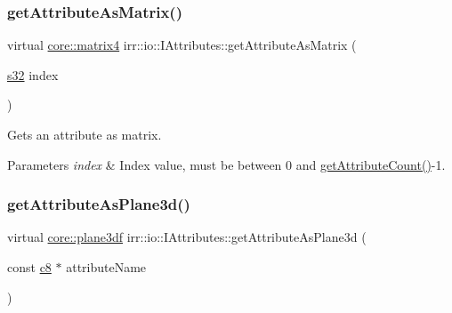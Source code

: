 \subsubsection{\texorpdfstring{get\+Attribute\+As\+Matrix()}{getAttributeAsMatrix()}\hspace{0.1cm}{\footnotesize\ttfamily [2/2]}}
{\footnotesize\ttfamily virtual \hyperlink{namespaceirr_1_1core_a73fa92e638c5ca97efd72da307cc9b65}{core\+::matrix4} irr\+::io\+::\+I\+Attributes\+::get\+Attribute\+As\+Matrix (\begin{DoxyParamCaption}\item[{\hyperlink{namespaceirr_ac66849b7a6ed16e30ebede579f9b47c6}{s32}}]{index }\end{DoxyParamCaption})\hspace{0.3cm}{\ttfamily [pure virtual]}}



Gets an attribute as matrix. 


\begin{DoxyParams}{Parameters}
{\em index} & Index value, must be between 0 and \hyperlink{classirr_1_1io_1_1IAttributes_a796bdd9440ee7ba0b6742a90a82870b6}{get\+Attribute\+Count()}-\/1. \\
\hline
\end{DoxyParams}
\mbox{\label{classirr_1_1io_1_1IAttributes_a1d660e66f832cd670a47f5898bc0f5df}} 
\subsubsection{\texorpdfstring{get\+Attribute\+As\+Plane3d()}{getAttributeAsPlane3d()}\hspace{0.1cm}{\footnotesize\ttfamily [1/2]}}
{\footnotesize\ttfamily virtual \hyperlink{namespaceirr_1_1core_ae7491b7985dcb74b840bfcd9c054b232}{core\+::plane3df} irr\+::io\+::\+I\+Attributes\+::get\+Attribute\+As\+Plane3d (\begin{DoxyParamCaption}\item[{const \hyperlink{namespaceirr_a9395eaea339bcb546b319e9c96bf7410}{c8} $\ast$}]{attribute\+Name }\end{DoxyParamCaption})\hspace{0.3cm}{\ttfamily [pure virtual]}}



